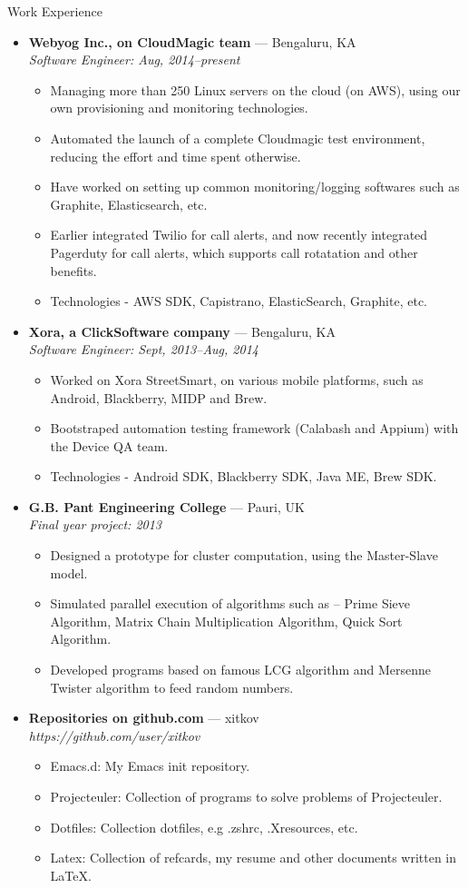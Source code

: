\documentclass[a4paper,11pt,oneside]{article}
\newenvironment{ressection}[1]{
  \vspace{4pt}
         {\fontfamily{phv}\selectfont\Large#1}
         \begin{itemize}
           \vspace{3pt}
}{
         \end{itemize}
}
\newcommand{\ressubitem}[1]{
  \vspace{-1pt}
\item \begin{flushleft} #1 \end{flushleft}
}
\newcommand{\resbigitem}[3]{
  \vspace{-5pt}
\item
  \textbf{#1} --- #2 \\
  \textit{#3}
}
\newenvironment{ressubsec}[3]{
  \resbigitem{#1}{#2}{#3}
  \vspace{-2pt}
  \begin{itemize}
}{
  \end{itemize}
}
\begin{document}
\begin{ressection}{Work Experience}
  \begin{ressubsec}{Webyog Inc., on CloudMagic team}{Bengaluru, KA}{Software Engineer: Aug, 2014--present}
    \ressubitem{Managing more than 250 Linux servers on the cloud (on AWS), using our own provisioning and monitoring technologies.}
    \ressubitem{Automated the launch of a complete Cloudmagic test environment, reducing the effort and time spent otherwise.}
    \ressubitem{Have worked on setting up common monitoring/logging softwares such as Graphite, Elasticsearch, etc.}
    \ressubitem{Earlier integrated Twilio for call alerts, and now recently integrated Pagerduty for call alerts, which supports call rotatation and other benefits.}
    \ressubitem{Technologies - AWS SDK, Capistrano, ElasticSearch, Graphite, etc.}
  \end{ressubsec}
  \begin{ressubsec}{Xora, a ClickSoftware company}{Bengaluru, KA}{Software Engineer: Sept, 2013--Aug, 2014}
    \ressubitem{Worked on Xora StreetSmart, on various mobile platforms, such as Android, Blackberry, MIDP and Brew.}
    \ressubitem{Bootstraped automation testing framework (Calabash and Appium) with the Device QA team.}
    \ressubitem{Technologies - Android SDK, Blackberry SDK, Java ME, Brew SDK.}
  \end{ressubsec}
  \begin{ressubsec}{G.B. Pant Engineering College}{Pauri, UK}{Final year project: 2013}
    \ressubitem{Designed a prototype for cluster computation, using the Master-Slave model.}
    \ressubitem{Simulated parallel execution of algorithms such as -- Prime Sieve Algorithm, Matrix Chain Multiplication Algorithm, Quick Sort Algorithm.}
    \ressubitem{Developed programs based on famous LCG algorithm and Mersenne Twister algorithm to feed random numbers.}
  \end{ressubsec}
  \begin{ressubsec}{Repositories on github.com}{xitkov}{https://github.com/user/xitkov}
    \ressubitem{Emacs.d: My Emacs init repository.}
    \ressubitem{Projecteuler: Collection of programs to solve problems of Projecteuler.}
    \ressubitem{Dotfiles: Collection dotfiles, e.g .zshrc, .Xresources, etc.}
    \ressubitem{Latex:  Collection of refcards, my resume and other documents written in \LaTeX.}
  \end{ressubsec}
\end{ressection}
\end{document}
